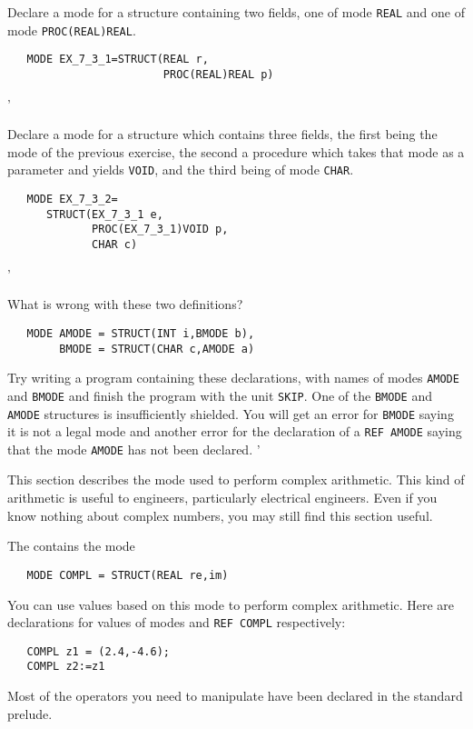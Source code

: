 \begin{exercise}
\item Declare a mode for a structure containing two fields, one of mode
\verb|REAL| and one of mode \verb|PROC(REAL)REAL|.
\ans \ %
\begin{verbatim}
   MODE EX_7_3_1=STRUCT(REAL r,
                        PROC(REAL)REAL p)
\end{verbatim}
'
\item Declare a mode for a structure which contains three fields, the
first being the mode of the previous exercise, the second a procedure
which takes that mode as a parameter and yields \verb|VOID|, and the third
being of mode \verb|CHAR|.
\ans \ %
\begin{verbatim}
   MODE EX_7_3_2=
      STRUCT(EX_7_3_1 e,
             PROC(EX_7_3_1)VOID p,
             CHAR c)
\end{verbatim}
'
\item What is wrong with these two definitions?
\begin{verbatim}
   MODE AMODE = STRUCT(INT i,BMODE b),
        BMODE = STRUCT(CHAR c,AMODE a)
\end{verbatim}
\noindent
Try writing a program containing these declarations, with names
of modes \verb|AMODE| and \verb|BMODE| and finish the program with
the unit \verb|SKIP|.  \ans One of the \verb|BMODE| and \verb|AMODE|
structures is insufficiently shielded. You will get an error for
\verb|BMODE| saying it is not a legal mode and another error for the
declaration of a \verb|REF AMODE| saying that the mode \verb|AMODE|
has not been declared.
'
\end{exercise}

This section describes the mode used to perform complex arithmetic.
This kind of arithmetic is useful to engineers, particularly electrical
engineers. Even if you know nothing about complex numbers, you may
still find this section useful.

The  contains the mode
\begin{verbatim}
   MODE COMPL = STRUCT(REAL re,im)
\end{verbatim}
\noindent
You can use values based on this mode to perform complex arithmetic.
Here are declarations for values of modes  and
\verb|REF COMPL| respectively:
\begin{verbatim}
   COMPL z1 = (2.4,-4.6);
   COMPL z2:=z1
\end{verbatim}
\noindent
Most of the operators you need to manipulate 
have been declared in the standard prelude.

